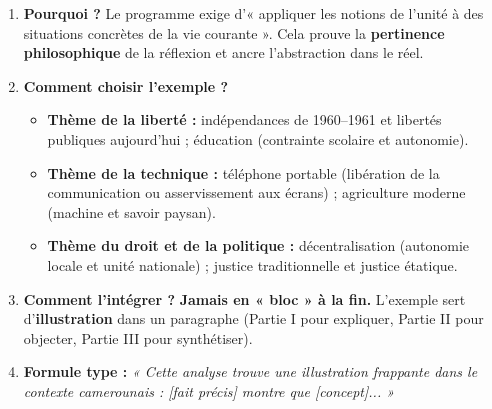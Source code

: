 \documentclass[11pt]{article}
\begin{document}
\begin{methode}
\begin{enumerate}
    \item \textbf{Pourquoi ?} Le programme exige d'« appliquer les notions de l'unité à des situations concrètes de la vie courante ». Cela prouve la \textbf{pertinence philosophique} de la réflexion et ancre l'abstraction dans le réel.
    \item \textbf{Comment choisir l'exemple ?}
    \begin{itemize}
        \item \textbf{Thème de la liberté :} indépendances de 1960--1961 et libertés publiques aujourd'hui ; éducation (contrainte scolaire et autonomie).
        \item \textbf{Thème de la technique :} téléphone portable (libération de la communication ou asservissement aux écrans) ; agriculture moderne (machine et savoir paysan).
        \item \textbf{Thème du droit et de la politique :} décentralisation (autonomie locale et unité nationale) ; justice traditionnelle et justice étatique.
    \end{itemize}
    \item \textbf{Comment l'intégrer ?} \textbf{Jamais en « bloc » à la fin.} L'exemple sert d'\textbf{illustration} dans un paragraphe (Partie I pour expliquer, Partie II pour objecter, Partie III pour synthétiser).
    \item \textbf{Formule type :} \emph{« Cette analyse trouve une illustration frappante dans le contexte camerounais : [fait précis] montre que [concept]... »}
\end{enumerate}
\end{methode}
\end{document}
